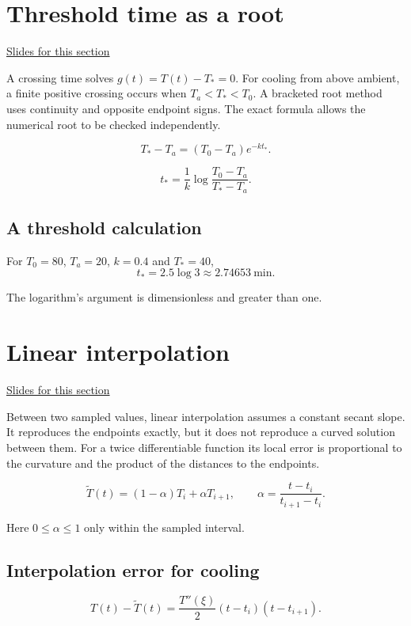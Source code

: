 \documentclass[11pt,letterpaper]{article}
\theoremstyle{definition}\newtheorem{definition}{Definition}\newtheorem{example}{Example}
\numberwithin{equation}{section}
\begin{document}
\section{Threshold time as a root}
\hypertarget{note-threshold-time-as-a-root}{}\label{note:threshold-time-as-a-root}
{\small \href{slides.html\#frame=threshold-time-as-a-root\&step=1}{Slides for this section}}\par
A crossing time solves $g(t)=T(t)-T_*=0$. For cooling from above ambient, a finite positive crossing occurs when $T_a<T_*<T_0$. A bracketed root method uses continuity and opposite endpoint signs. The exact formula allows the numerical root to be checked independently.

\[
T_*-T_a=(T_0-T_a)e^{-kt_*}.
\]

\[
t_* =\frac1k\log\frac{T_0-T_a}{T_*-T_a}.
\]

\subsection*{A threshold calculation}
For $T_0=80$, $T_a=20$, $k=0.4$ and $T_*=40$,
\[
t_* =2.5\log3\approx2.74653\ \mathrm{min}.
\]

The logarithm's argument is dimensionless and greater than one.
\section{Linear interpolation}
\hypertarget{note-linear-interpolation}{}\label{note:linear-interpolation}
{\small \href{slides.html\#frame=cooling-trajectory-and-interpolation-error-figure\&step=1}{Slides for this section}}\par
Between two sampled values, linear interpolation assumes a constant secant slope. It reproduces the endpoints exactly, but it does not reproduce a curved solution between them. For a twice differentiable function its local error is proportional to the curvature and the product of the distances to the endpoints.

\[
\widetilde T(t)=(1-\alpha)T_i+\alpha T_{i+1},\qquad
\alpha=\frac{t-t_i}{t_{i+1}-t_i}.
\]

Here $0\leq\alpha\leq1$ only within the sampled interval.

\subsection*{Interpolation error for cooling}
\[
T(t)-\widetilde T(t)=\frac{T''(\xi)}2(t-t_i)(t-t_{i+1}).
\]
\end{document}
